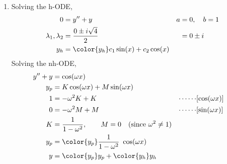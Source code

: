\begin{enumerate}
    \item Solving the h-ODE,
          \begin{align}
              0                        & = y'' + y                                 & a & = 0, \quad b = 1 \\
              \lambda_{1}, \lambda_{2} & = \frac{0 \pm i\sqrt{4}}{2}               &   & = 0 \pm i        \\
              y_{h}                    & = \color{y_h} c_{1}\sin(x) + c_{2}\cos(x)
          \end{align}
          Solving the nh-ODE,
          \begin{align}
              y'' + y & = \cos(\omega x)                                                                                                   \\
              y_{p}   & = K \cos(\omega x) + M \sin(\omega x)                                                                              \\
              1       & = -\omega^{2}K + K                                                               & \cdots\cdots & [\cos(\omega x)] \\
              0       & = -\omega^{2}M + M                                                               & \cdots\cdots & [\sin(\omega x)] \\
              K       & = \frac{1}{1 - \omega^{2}}, \qquad M = 0 \quad (\text{since}\ \omega^{2} \neq 1)                                   \\
              y_{p}   & = \color{y_p} \frac{1}{1 - \omega^{2}}\ \cos(\omega x)                                                             \\
              y       & = {\color{y_p} y_{p}} + {\color{y_h} y_{h}}
          \end{align}


\end{enumerate}
